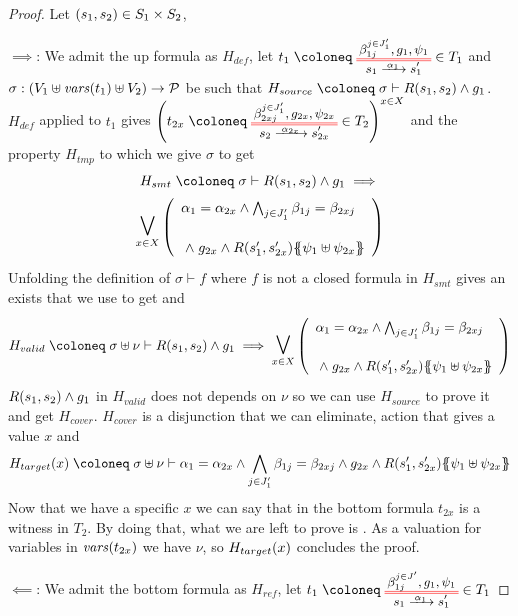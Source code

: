 \documentclass{article}
\begin{document}
\begin{proof} Let \({\left(s_1, s_2\right)} \in S_1 \times S_2\),
\item[\(\implies\):] We admit the up formula as \(H_{def}\), let \(t_1 \defobject \OTx{1}{}{1}{1} \in T_1\) and \(\sigma: {\left(V_1 \uplus \mathit{vars}{\left(t_1\right)} \uplus V_2\right)} \to \mathcal{P}\) be such that \(H_{source} \defobject \sigma \vdash R\mpar{s_1, s_2} \wedge g_1\).
	\(H_{def}\) applied to \(t_1\) gives \(\mpar{t_{2x} \defobject \OTx{2}{x}{2x}{1} \in T_2}^{x \in X}\) and the property \(H_{tmp}\) to which we give \(\sigma\) to get
	\begin{multline*}
		H_{smt} \defobject \sigma \vdash R\mpar{s_1, s_2} \wedge g_1 \implies \\
		\operatorname*{\bigsymb{\bigvee}}_{x \in X} \mpar{\begin{array}{l}
			\alpha_1 = \alpha_{2x} \wedge \bigwedge_{j \in J'_1} \beta_{1j} = \beta_{2xj} \\[12pt]
			\nwedge g_{2x} \wedge R\mpar{s'_1, s'_{2x}}\psubst{\psi_1 \uplus \psi_{2x}}
		\end{array}}
	\end{multline*}
	Unfolding the definition of \(\sigma \vdash f\) where \(f\) is not a closed formula in \(H_{smt}\) gives an exists that we use to get  and
	\[ H_{valid} \defobject \sigma \uplus \nu \vdash R\mpar{s_1, s_2} \wedge g_1 \implies \operatorname*{\bigsymb{\bigvee}}_{x \in X} \mpar{\begin{array}{l}
		\alpha_1 = \alpha_{2x} \wedge \bigwedge_{j \in J'_1} \beta_{1j} = \beta_{2xj} \\[12pt]
		\nwedge g_{2x} \wedge R\mpar{s'_1, s'_{2x}}\psubst{\psi_1 \uplus \psi_{2x}}
	\end{array}} \]
	\(R{\left(s_1, s_2\right)} \wedge g_1\) in \(H_{valid}\) does not depends on \(\nu\) so we can use \(H_{source}\) to prove it and get \(H_{cover}\).
	\(H_{cover}\) is a disjunction that we can eliminate, action that gives a value \(x\) and
	\[ H_{target}\mpar{x} \defobject \sigma \uplus \nu \vdash \alpha_1 = \alpha_{2x} \wedge \bigwedge_{j \in J'_1} \beta_{1j} = \beta_{2xj} \wedge g_{2x} \wedge R\mpar{s'_1, s'_{2x}}\psubst{\psi_1 \uplus \psi_{2x}} \]
	Now that we have a specific \(x\) we can say that in the bottom formula \(t_{2x}\) is a witness in \(T_2\).
	By doing that, what we are left to prove is .
	As a valuation for variables in \(\mathit{vars}{\left(t_{2x}\right)}\) we have \(\nu\), so \(H_{target}{\left(x\right)}\) concludes the proof.
\item[\(\impliedby\):] We admit the bottom formula as \(H_{ref}\), let \(t_1 \defobject \OTx{1}{}{1}{} \in T_1\) %
\end{proof}
\end{document}
